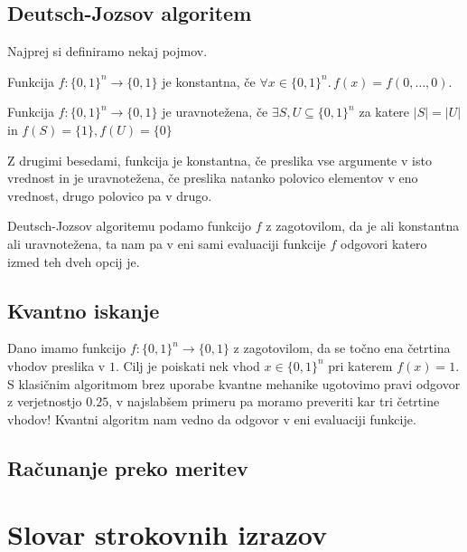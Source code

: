 \documentclass[mat1]{fmfdelo}
\newcommand{\sep}{\ensuremath{.\,}}
\begin{document}
\subsection{Deutsch-Jozsov algoritem}
Najprej si definiramo nekaj pojmov.
\begin{definicija} Funkcija \(f:\{0,1\}^n\to \{0,1\}\) je konstantna, če \(\forall x\in\{0,1\}^n\sep f(x) = f(0,\ldots, 0)\).\end{definicija}
\begin{definicija}
    Funkcija \(f: \{0,1\}^n \to \{0,1\}\) je uravnotežena, če \(\exists S, U\subseteq \{0,1\}^n\) za katere \(\lvert S\rvert = \lvert U\rvert\) in \(f(S) = \{1\}, f(U) = \{0\}\)
\end{definicija}
Z drugimi besedami, funkcija je konstantna, če preslika vse argumente v isto vrednost in je uravnotežena, če preslika natanko polovico elementov v eno vrednost, drugo polovico pa v drugo.

Deutsch-Jozsov algoritemu podamo funkcijo \(f\) z zagotovilom, da je ali konstantna ali uravnotežena, ta nam pa v eni sami evaluaciji funkcije \(f\) odgovori katero izmed teh dveh opcij je.
\subsection{Kvantno iskanje}
Dano imamo funkcijo \(f: \{0,1\}^n\to \{0,1\}\) z zagotovilom, da se točno ena četrtina vhodov preslika v \(1\). Cilj je poiskati nek vhod \(x\in\{0,1\}^n\) pri katerem \(f(x) = 1\). S klasičnim algoritmom brez uporabe kvantne mehanike ugotovimo pravi odgovor z verjetnostjo \(0.25\), v najslabšem primeru pa moramo preveriti kar tri četrtine vhodov! Kvantni algoritm nam vedno da odgovor v eni evaluaciji funkcije.
\subsection{Računanje preko meritev}


\section*{Slovar strokovnih izrazov}



\printbibliography
\end{document}
